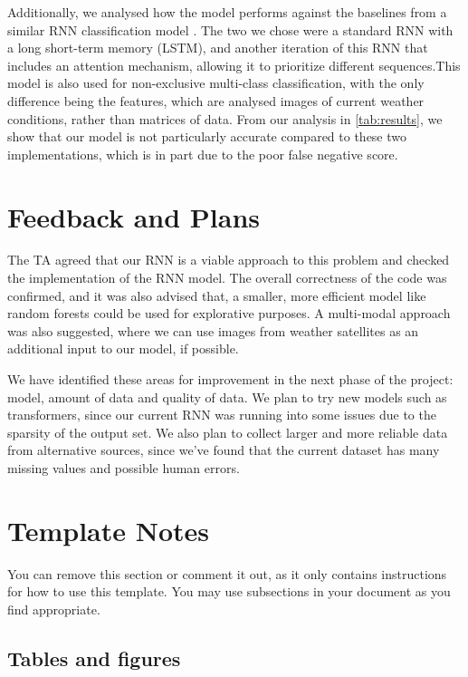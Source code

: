 \documentclass[11pt]{article}
\begin{document}
Additionally, we analysed how the model performs against the baselines from a similar RNN classification model \citep{zhao2019cnnrnnarchitecturemultilabelweather}. The two we chose were a standard RNN with a long short-term memory (LSTM), and another iteration of this RNN that includes an attention mechanism, allowing it to prioritize different sequences.This model is also used for non-exclusive multi-class classification, with the only difference being the features, which are analysed images of current weather conditions, rather than matrices of data. From our analysis in \ref{tab:results}, we show that our model is not particularly accurate compared to these two implementations, which is in part due to the poor false negative score.

\section{Feedback and Plans}

The TA agreed that our RNN is a viable approach to this problem and checked the implementation of the RNN model. The overall correctness of the code was confirmed, and it was also advised that, a smaller, more efficient model like random forests could be used for explorative purposes. A multi-modal approach was also suggested, where we can use images from weather satellites as an additional input to our model, if possible.

We have identified these areas for improvement in the next phase of the project: model, amount of data and quality of data. We plan to try new models such as transformers, since our current RNN was running into some issues due to the sparsity of the output set. We also plan to collect larger and more reliable data from alternative sources, since we've found that the current dataset has many missing values and possible human errors.



\iffalse
\section{Template Notes}

You can remove this section or comment it out, as it only contains instructions for how to use this template. You may use subsections in your document as you find appropriate.

\subsection{Tables and figures}
\end{document}
